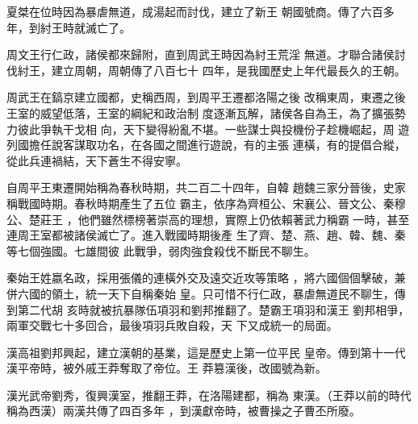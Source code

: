 \documentclass[avery5371,grid]{flashcards}
\begin{document}
{夏桀在位時因為暴虐無道，成湯起而討伐，建立了新王
朝國號商。傳了六百多年，到紂王時就滅亡了。} %
{} %

{周文王行仁政，諸侯都來歸附，直到周武王時因為紂王荒淫
無道。才聯合諸侯討伐紂王，建立周朝，周朝傳了八百七十
四年，是我國歷史上年代最長久的王朝。} %
{} %

{周武王在鎬京建立國都，史稱西周，到周平王遷都洛陽之後
改稱東周，東遷之後王室的威望低落，王室的綱紀和政治制
度逐漸瓦解，諸侯各自為王，為了擴張勢力彼此爭執干戈相
向，天下變得紛亂不堪。一些謀士與投機份子趁機崛起，周
遊列國擔任說客謀取功名，在各國之間進行遊說，有的主張
連橫，有的提倡合縱，從此兵連禍結，天下蒼生不得安寧。} %
{} %

{自周平王東遷開始稱為春秋時期，共二百二十四年，自韓
趙魏三家分晉後，史家稱戰國時期。春秋時期產生了五位
霸主，依序為齊桓公、宋襄公、晉文公、秦穆公、楚莊王
，他們雖然標榜著崇高的理想，實際上仍依賴著武力稱霸
一時，甚至連周王室都被諸侯滅亡了。進入戰國時期後產
生了齊、楚、燕、趙、韓、魏、秦等七個強國。七雄間彼
此戰爭，弱肉強食殺伐不斷民不聊生。} %
{} %

{秦始王姓嬴名政，採用張儀的連橫外交及遠交近攻等策略
，將六國個個擊破，兼併六國的領土，統一天下自稱秦始
皇。只可惜不行仁政，暴虐無道民不聊生，傳到第二代胡
亥時就被抗暴隊伍項羽和劉邦推翻了。楚霸王項羽和漢王
劉邦相爭，兩軍交戰七十多回合，最後項羽兵敗自殺，天
下又成統一的局面。} %
{} %








{漢高祖劉邦興起，建立漢朝的基業，這是歷史上第一位平民
皇帝。傳到第十一代漢平帝時，被外戚王莽奪取了帝位。王
莽篡漢後，改國號為新。} %
{} %

{漢光武帝劉秀，復興漢室，推翻王莽，在洛陽建都，稱為
東漢。（王莽以前的時代稱為西漢）兩漢共傳了四百多年
，到漢獻帝時，被曹操之子曹丕所廢。} %
{} %
\end{document}
